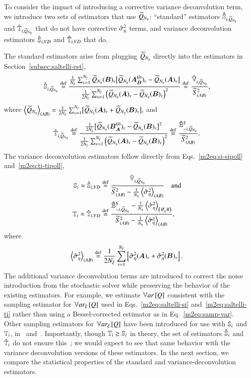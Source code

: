 To consider the impact of introducing a corrective variance deconvolution term, we introduce two sets of estimators that use $\Qpoll$: ``standard'' estimators $\pollSsalt{i}$ and $\pollTsalt{i}$ that do not have corrective $\hatSigsqeta$ terms, and variance deconvolution estimators $\unpollSsalt{i}$ and $\unpollTsalt{i}$ that do.

The standard estimators arise from plugging $\Qpoll$ directly into the estimators in Section~\ref{subsec:saltelli-est},
\begin{equation} \label{m2eq:saltelli-si-poll}
    \pollSsalt{i} \defin \frac{\frac{1}{\Nxi} \sumv \Qpoll(\bm{B})_v \bigl[ \Qpoll(\bm{A_B^{(i)}})_v - \Qpoll(\bm{A})_v \bigr]}{\frac{1}{2\Nxi} \sumv \left( \Qpoll(\bm{A})_v - \Qpoll(\bm{B})_v \right)^2} \defin \frac{\pollVsalt{i}}{\varTotal{AB}},
\end{equation}
where $\meanQpoll{AB} = \frac{1}{2\Nxi} \sumv \bigl[ \Qpoll(\bm{A})_v + \Qpoll(\bm{B})_v \bigr] ,$ and 
\begin{equation} \label{m2eq:saltelli-ti-poll}
    \pollTsalt{i} \defin \frac{ \frac{1}{2\Nxi} \bigl[ \Qpoll(\bm{B_A^{(i)}})_v - \Qpoll(\bm{B})_v \bigr]^2}{\frac{1}{2\Nxi} \sumv \left( \Qpoll(\bm{A})_v - \Qpoll(\bm{B})_v \right)^2} \defin \frac{\pollEsalt{\ni}}{\varTotal{AB}}.
\end{equation}
The variance deconvolution estimators follow directly from Eqs.~\eqref{m2eq:si-sipoll} and~\eqref{m2eq:ti-tipoll},
\begin{align}
    \S{i} \approx \unpollSsalt{i} &\defin \frac{\pollVsalt{i}}{\varTotal{AB} - \frac{1}{\Neta}\meanHatsigsqeta{AB}} \quad \text{and} \\
    \T{i} \approx \unpollTsalt{i} &\defin \frac{\pollEsalt{\ni} -{\frac{1}{\Neta} \meanHatsigsqeta{B_A^i B}}}{\varTotal{AB} - \frac{1}{\Neta} \meanHatsigsqeta{AB}} ,
\end{align}
where 
\begin{equation}
    \meanHatsigsqeta{AB} \defin \frac{1}{2\Nxi} \sumv \left[ \hatSigsqeta(\bm{A})_v + \hatSigsqeta(\bm{B})_v \right].
\end{equation}
The additional variance deconvolution terms are introduced to correct the noise introduction from the stochastic solver while preserving the behavior of the existing estimators. 
For example, we estimate $\Var{Q}$ consistent with the sampling estimator for $\Vxi{Q}$ used in Eqs.~\eqref{m2eq:saltelli-si} and~\eqref{m2eq:saltelli-ti} rather than using a Bessel-corrected estimator as in Eq.~\eqref{m2eq:samp-var}.
Other sampling estimators for $\Vxi{Q}$ have been introduced for use with $\S{i}$ and $\T{i}$, \eg in~\cite{saltelli-2002} and~\cite{saltelli-etal-2010}.
Importantly, though $\T{i} \geq \S{i}$ in theory, the set of estimators $\Ssalt{i}$ and $\Tsalt{i}$ do not ensure this~\cite{azzini-etal-2021}; we would expect to see that same behavior with the variance deconvolution versions of these estimators.
In the next section, we compare the statistical properties of the standard and variance-deconvolution estimators.

